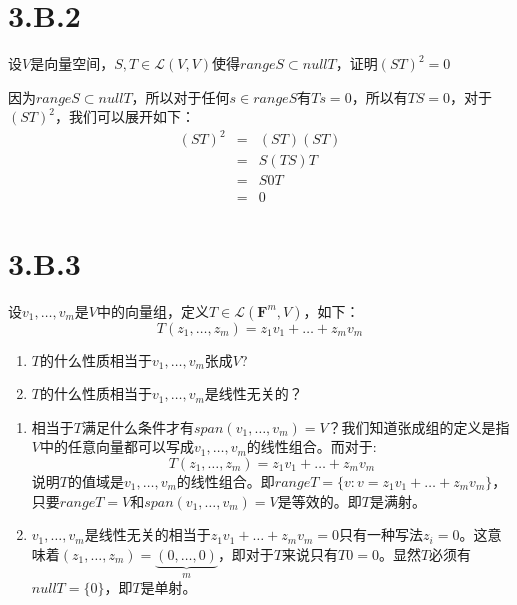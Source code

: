 \documentclass[10pt,a4paper,UTF8]{article}
\begin{document}
\section{3.B.2}
\label{sec:orgca976d2}


\begin{problem}
设\(V\)是向量空间，\(S,T\in \mathcal{L}(V,V)\)使得\(range S\subset nullT\)，证明\((ST)^{2} = 0\)
\end{problem}

\begin{answer}
因为\(range S \subset nullT\)，所以对于任何\(s\in rangeS\)有\(Ts = 0\)，所以有\(TS = 0\)，对于\((ST)^{2}\)，我们可以展开如下：
\begin{eqnarray*}
(ST)^{2}&=&(ST)(ST) \\
&=&S(TS)T \\
&=&S0T \\
&=&0
\end{eqnarray*}
\end{answer}

\section{3.B.3}
\label{sec:org3598b5e}


\begin{problem}
设\(v_{1},\ldots ,v_{m}\)是\(V\)中的向量组，定义\(T\in \mathcal{L}( \mathbf{F}^{m},V)\)，如下：\[T(z_{1},\ldots ,z_{m}) = z_{1}v_{1} + \ldots + z_{m}v_{m}\]

\begin{enumerate}
\item \(T\)的什么性质相当于\(v_{1},\ldots ,v_{m}\)张成\(V\)?
\item \(T\)的什么性质相当于\(v_{1},\ldots ,v_{m}\)是线性无关的？
\end{enumerate}
\end{problem}

\begin{answer}
\begin{enumerate}
\item 相当于\(T\)满足什么条件才有\(span(v_{1},\ldots ,v_{m}) = V\)？我们知道张成组的定义是指\(V\)中的任意向量都可以写成\(v_{1},\ldots ,v_{m}\)的线性组合。而对于:\[T(z_{1},\ldots ,z_{m}) = z_{1}v_{1} + \ldots + z_{m}v_{m}\] 说明\(T\)的值域是\(v_{1},\ldots ,v_{m}\)的线性组合。即\(range T = \{v:v = z_{1}v_{1} + \ldots + z_{m}v_{m}\}\)，只要\(range T = V\)和\(span(v_{1},\ldots ,v_{m}) = V\)是等效的。即\(T\)是满射。

\item \(v_{1},\ldots ,v_{m}\)是线性无关的相当于\(z_{1}v_{1} +  \ldots + z_{m}v_{m}=0\)只有一种写法\(z_{i}=0\)。这意味着\((z_{1},\ldots ,z_{m}) = \underbrace{(0,\ldots ,0)}_{m}\)，即对于\(T\)来说只有\(T0 = 0\)。显然\(T\)必须有\(nullT = \{0\}\)，即\(T\)是单射。
\end{enumerate}
\end{answer}
\end{document}
